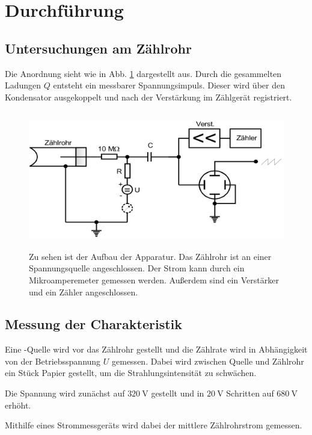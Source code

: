 \section{Durchführung}
\label{sec:Durchführung}

\subsection{Untersuchungen am Zählrohr}

Die Anordnung sieht wie in Abb. \ref{fig:aufbau} dargestellt aus. Durch die gesammelten Ladungen $Q$ entsteht ein messbarer Spannungsimpuls. Dieser wird über den Kondensator ausgekoppelt und nach der Verstärkung im Zählgerät registriert.

\begin{figure}
    \centering
    \includegraphics[width=12cm, height=6cm]{build/aufbau.png}
    \caption{Zu sehen ist der Aufbau der Apparatur. Das Zählrohr ist an einer Spannungsquelle angeschlossen. Der Strom kann durch ein Mikroamperemeter gemessen werden. Außerdem sind ein Verstärker und ein Zähler angeschlossen. \cite{V703}}
    \label{fig:aufbau}
\end{figure}

\subsection{Messung der Charakteristik}
Eine \beta-Quelle wird vor das Zählrohr gestellt und die Zählrate wird in Abhängigkeit von der Betriebsspannung $U$ gemessen. Dabei wird zwischen Quelle und Zählrohr ein Stück Papier gestellt, um die Strahlungsintensität zu schwächen.

\noindent Die Spannung wird zunächst auf $\SI{320}{\volt}$ gestellt und in $\SI{20}{\volt}$ Schritten auf $\SI{680}{\volt}$ erhöht.

\noindent Mithilfe eines Strommessgeräts wird dabei der mittlere Zählrohrstrom gemessen.


